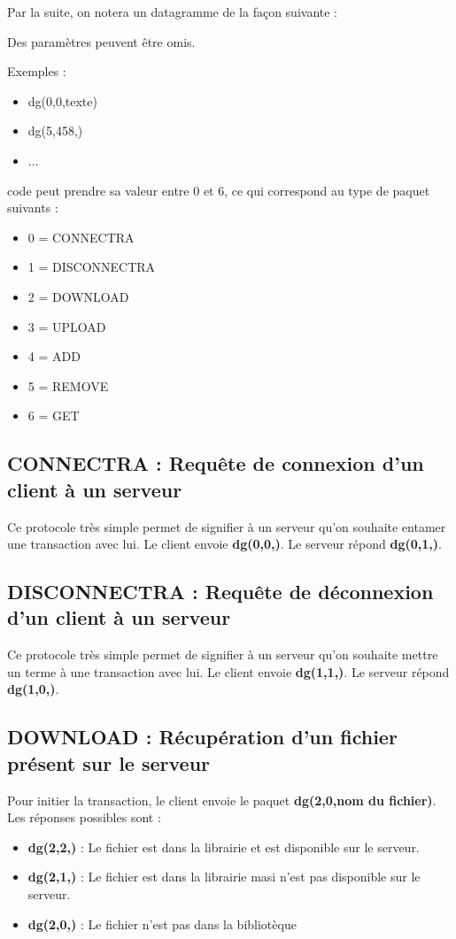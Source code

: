 \documentclass[10pt,a4paper]{article}
\begin{document}
Par la suite, on notera un datagramme de la façon suivante :

\begin{center}
\end{center}

Des paramètres peuvent être omis.

Exemples :
\begin{itemize}
 \item dg(0,0,texte)
 \item dg(5,458,)
 \item ...
\end{itemize}


code peut prendre sa valeur entre 0 et 6, ce qui correspond au type de paquet suivants :
\begin{itemize}
 \item 0 = CONNECTRA
 \item 1 = DISCONNECTRA
 \item 2 = DOWNLOAD
 \item 3 = UPLOAD
 \item 4 = ADD
 \item 5 = REMOVE
 \item 6 = GET
\end{itemize}

\subsection{CONNECTRA : Requête de connexion d'un client à un serveur}
Ce protocole très simple permet de signifier à un serveur qu'on souhaite entamer une transaction avec lui.
Le client envoie \textbf{dg(0,0,)}. Le serveur répond \textbf{dg(0,1,)}.

\subsection{DISCONNECTRA : Requête de déconnexion d'un client à un serveur}
Ce protocole très simple permet de signifier à un serveur qu'on souhaite mettre un terme à une transaction avec lui.
Le client envoie \textbf{dg(1,1,)}. Le serveur répond \textbf{dg(1,0,)}.

\subsection{DOWNLOAD : Récupération d'un fichier présent sur le serveur}
Pour initier la transaction, le client envoie le paquet \textbf{dg(2,0,nom du fichier)}.
Les réponses possibles sont :
\begin{itemize}
 \item \textbf{dg(2,2,)} : Le fichier est dans la librairie et est disponible sur le serveur.
 \item \textbf{dg(2,1,)} : Le fichier est dans la librairie masi n'est pas disponible sur le serveur.
 \item \textbf{dg(2,0,)} : Le fichier n'est pas dans la bibliotèque
\end{itemize}
\end{document}
